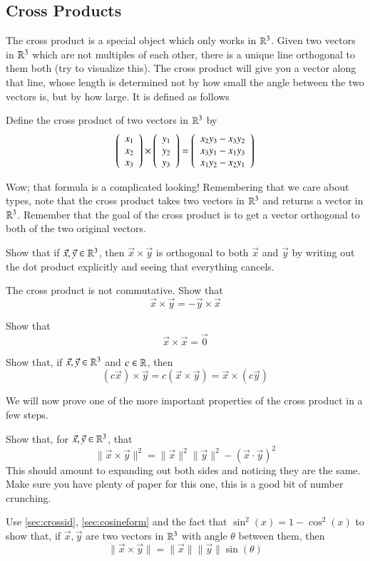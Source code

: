 \documentclass[Main.tex]{subfiles}
\begin{document}
\subsection{Cross Products}

The cross product is a special object which only works in $\mathbb{R}^3$.  
Given two vectors in $\mathbb{R}^3$ which are not multiples of each other, there is a unique line orthogonal to them both (try to visualize this).
The cross product will give you a vector along that line, whose length is determined not by how small the angle between the two vectors is, but by how large.
It is defined as follows
\begin{Def}
  Define the cross product of two vectors in $\mathbb{R}^3$ by
  \[\left(\begin{array}{c}x_1\\x_2\\x_3\end{array}\right)\times\left(\begin{array}{c}y_1\\y_2\\y_3\end{array}\right) = \left(\begin{array}{c}x_2y_3-x_3y_2\\x_3y_1-x_1y_3\\x_1y_2-x_2y_1\end{array}\right)\]
\end{Def}
Wow; that formula is a complicated looking!
Remembering that we care about types, note that the cross product takes two vectors in $\mathbb{R}^3$ and returns a vector in $\mathbb{R}^3$.  
Remember that the goal of the cross product is to get a vector orthogonal to both of the two original vectors.
\begin{ImpEx}
  Show that if $\vec{x},\vec{y}\in\mathbb{R}^3$, then $\vec{x}\times\vec{y}$ is orthogonal to both $\vec{x}$ and $\vec{y}$ by writing out the dot product explicitly and seeing that everything cancels.
\end{ImpEx}
\begin{EasyEx}
  The cross product is not commutative.
  Show that
  \[\vec{x}\times\vec{y} = - \vec{y}\times\vec{x}\]
\end{EasyEx}
\begin{EasyEx}
  Show that
  \[\vec{x}\times\vec{x}=\vec{0}\]
\end{EasyEx}
\begin{EasyEx}
  Show that, if $\vec{x},\vec{y}\in\mathbb{R}^3$ and $c\in \mathbb{R}$, then
  \[(c\vec{x})\times\vec{y}=c(\vec{x}\times\vec{y})=\vec{x}\times(c\vec{y})\]
\end{EasyEx}

We will now prove one of the more important properties of the cross product in a few steps.
\begin{Ex}
  \label{sec:crossid}
  Show that, for $\vec{x},\vec{y}\in\mathbb{R}^3$, that
  \[\|\vec{x}\times\vec{y}\|^2 = \|\vec{x}\|^2\|\vec{y}\|^2 - (\vec{x}\cdot\vec{y})^2\]
  This should amount to expanding out both sides and noticing they are the same.
  Make sure you have plenty of paper for this one, this is a good bit of number crunching.
\end{Ex}
\begin{Ex}
  \label{sec:sineform}
  Use \ref{sec:crossid}, \ref{sec:cosineform} and the fact that $\sin^2(x)=1-\cos^2(x)$ to show that,
  if $\vec{x},\vec{y}$ are two vectors in $\mathbb{R}^3$ with angle $\theta$ between them, then
  \[\|\vec{x}\times\vec{y}\| = \|\vec{x}\|\|\vec{y}\|\sin(\theta)\]
\end{Ex}
\end{document}
